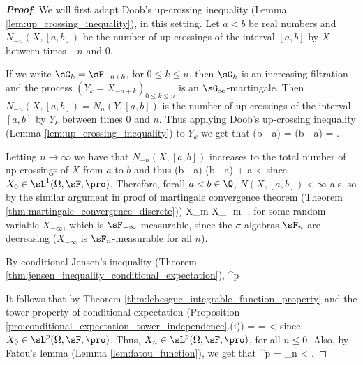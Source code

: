 \begin{proof}[\bf Proof]
We will first adapt Doob's up-crossing inequality (Lemma \ref{lem:up_crossing_inequality}), in this setting. Let $a < b$ be real numbers and $N_{-n}(X,[a, b])$ be the number of up-crossings of the interval $[a, b]$ by $X$ between times $-n$ and 0.%

If we write $\sG_k = \sF_{-n+k}$, for $0 \leq k \leq n$, then $\sG_k$ is an increasing filtration and the process $(Y_k = X_{-n+k})_{0 \leq k \leq n}$ is an $\sG_\infty$-martingale. Then $N_{-n}(X,[a, b]) = N_{n}(Y,[a, b])$ is the number of up-crossings of the interval $[a,b]$ by $Y_k$ between times 0 and $n$. Thus applying Doob's up-crossing inequality (Lemma \ref{lem:up_crossing_inequality}) to $Y_k$ we get that
\be
(b - a)\E{} = (b - a)\E{} \leq \E{} = \E{}.
\ee


Letting $n \to \infty$ we have that $N_{-n}(X,[a, b])$ increases to the total number of up-crossings of $X$ from $a$ to $b$ and thus
\be
(b - a)\E{} \ua (b - a)\E{} \leq \E{} + a < \infty
\ee
since $X_0 \in \sL^1(\Omega,\sF,\pro)$. Therefore, forall $a<b\in \Q$, $N(X,[a,b]) < \infty$ a.s. so by the similar argument in proof of martingale convergence theorem (Theorem \ref{thm:martingale_convergence_discrete}))
\be
X_m \to X_{-\infty} m \to -\infty.%
\ee
for some random variable $X_{-\infty}$, which is $\sF_{-\infty}$-measurable, since the $\sigma$-algebras $\sF_n$ are decreasing ($X_{-\infty}$ is $\sF_n$-measurable for all $n$).

By conditional Jensen's inequality (Theorem \ref{thm:jensen_inequality_conditional_expectation}),
\be
{}^p \leq \E {}  %
\ee

It follows that by Theorem \ref{thm:lebesgue_integrable_function_property} and the tower property of conditional expectation (Proposition \ref{pro:conditional_expectation_tower_independence}.(i))
\be
\E{} = \E {} \leq \E{} = \E{} < \infty
\ee
since $X_0 \in \sL^p(\Omega,\sF,\pro)$. Thus, $X_n \in \sL^p(\Omega,\sF,\pro)$, for all $n \leq 0$. Also, by Fatou's lemma (Lemma \ref{lem:fatou_function}), we get that
\be
\E{}^p = \E {} \leq \liminf_n \E {} < \infty.
\ee


\end{proof}
